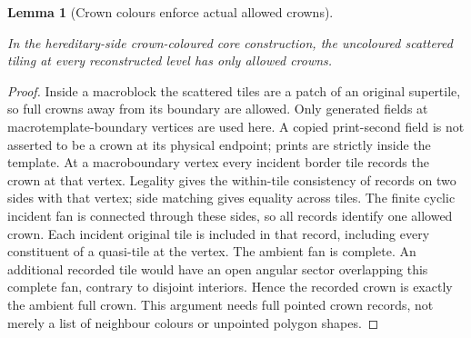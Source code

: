 \documentclass[11pt,a4paper]{article}
\newtheorem{lemma}[definition]{Lemma}
\theoremstyle{remark}
\newcommand{\lean}[1]{}
\newcommand{\uses}[1]{}
\begin{document}
\begin{lemma}[Crown colours enforce actual allowed crowns]
\label{lem:crown-colours}
\lean{Tilings.Decoration.crown_indices_sound}
\uses{def:certificate,def:crown,def:flc}
In the hereditary-side crown-coloured core construction, the uncoloured scattered
tiling at every reconstructed level has only allowed crowns.
\end{lemma}
\begin{proof}
Inside a macroblock the scattered tiles are a patch of an original
supertile, so full crowns away from its boundary are allowed.
Only generated fields at macrotemplate-boundary vertices are used here.
A copied print-second field is not asserted to be a crown at its physical
endpoint; prints are strictly inside the template.
At a macroboundary vertex every incident border tile records the crown
at that vertex. Legality gives the within-tile consistency of records on
two sides with that vertex; side matching gives equality across tiles.
The finite cyclic incident fan is connected through these sides, so all
records identify one allowed crown. Each incident original tile is included
in that record, including every constituent of a quasi-tile at the vertex.
The ambient fan is complete. An additional recorded tile would have an
open angular sector overlapping this complete fan, contrary to disjoint
interiors. Hence the recorded crown is exactly the ambient full crown.
This argument needs full pointed crown records, not merely a list of
neighbour colours or unpointed polygon shapes.
\end{proof}
\end{document}
